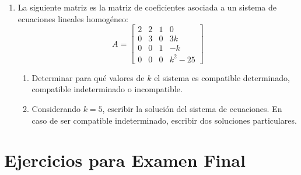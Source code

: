 \documentclass[11pt]{article}
\begin{document}
\begin{enumerate}[\hspace{-7mm} 1) ]
\begin{enumerate}[a) ]
\end{enumerate}











\item La siguiente matriz es la matriz de coeficientes asociada a un sistema de ecuaciones lineales homogéneo:
\[
A =
\begin{bmatrix}
2 & 2 & 1 & 0 \\
0 & 3 & 0 & 3k \\
0 & 0 & 1 & -k \\
0 & 0 & 0 & k^2 - 25
\end{bmatrix}
\]

\begin{enumerate}
    \item[a)] Determinar para qué valores de \(k\) el sistema es compatible determinado, compatible indeterminado o incompatible.
    \item[b)] Considerando \(k = 5\), escribir la solución del sistema de ecuaciones. En caso de ser compatible indeterminado, escribir dos soluciones particulares.
\end{enumerate}

\end{enumerate}

\newpage
\section*{Ejercicios para Examen Final}
\end{document}
